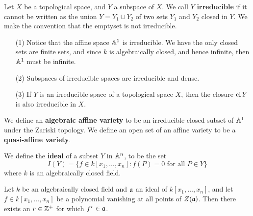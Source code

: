 \begin{definition}
    Let $X$ be a topological space, and  $Y$ a subspace of  $X$. We call  $Y$
     \textbf{irreducible} if it cannot be written as the union $Y=Y_1 \cup Y_2$
     of two sets $Y_1$ and $Y_2$ closed in $Y$. We make the convention that the
     emptyset is not irreducible.
\end{definition}

\begin{example}\label{example_1.3}
    \begin{enumerate}
        \item[(1)] Notice that the affine space $\mathbb{A}^1$ is irreducible. We have
            the only closed sets are finite sets, and since  $k$ is
            algebraically closed, and hence infinite, then  $\mathbb{A}^1$ must be
            infinite.

        \item[(2)] Subspaces of irreducible spaces are irreducible and dense.

        \item[(3)] If $Y$ is an irreducible space of a topological space  $X$,
            then the closure  $\operatorname{cl}{Y}$ is also irreducible in $X$.
    \end{enumerate}
\end{example}

\begin{definition}
    We define an \textbf{algebraic affine variety} to be an irreducible closed
    subset of $\mathbb{A}^1$ under the Zariski topology. We define an open set of an
    affine variety to be a  \textbf{quasi-affine variety}.
\end{definition}

\begin{definition}
    We define the \textbf{ideal} of a subset $Y$ in  $\mathbb{A}^n$, to be the set
    \begin{equation*}
        I(Y)=\{f \in k[x_1, \dots, x_n] : f(P)=0 \text{ for all } P \in Y\}
    \end{equation*}
    where $k$ is an algebraically closed field.
\end{definition}

\begin{theorem}\label{1.1.2}
    Let $k$ be an algebraically closed field and $\mathfrak{a}$ an ideal of $k[x_1, \dots,
    x_n]$, and let $f \in k[x_1, \dots, x_n]$ be a polynomial vanishing at all
    points of $Z(\mathfrak{a})$. Then there exists an $r \in \mathbb{Z}^+$ for which  $f^r \in
    \mathfrak{a}$.
\end{theorem}

